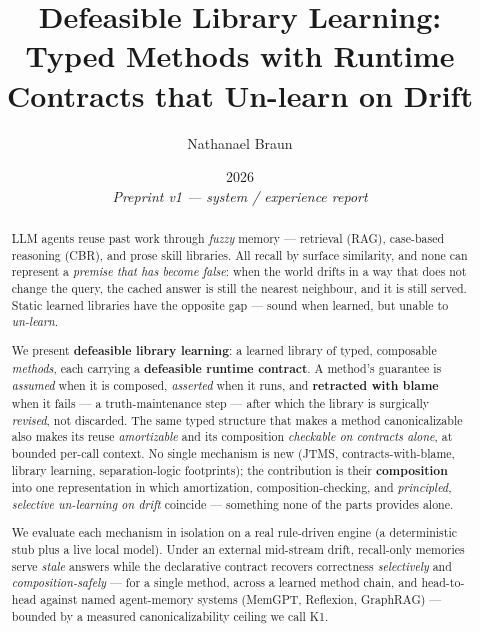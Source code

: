 \documentclass[11pt]{article}
\title{\textbf{Defeasible Library Learning:\\ Typed Methods with Runtime Contracts that Un-learn on Drift}}
\author{Nathanael Braun}
\date{2026 \\[2pt] {\normalsize\itshape Preprint v1 --- system / experience report}}
\newcommand{\K}{\textsf{K1}}
\begin{document}
\maketitle

\begin{abstract}
LLM agents reuse past work through \emph{fuzzy} memory --- retrieval (RAG), case-based reasoning (CBR), and prose
skill libraries. All recall by surface similarity, and none can represent a \emph{premise that has become false}:
when the world drifts in a way that does not change the query, the cached answer is still the nearest neighbour, and
it is still served. Static learned libraries have the opposite gap --- sound when learned, but unable to
\emph{un-learn}.

We present \textbf{defeasible library learning}: a learned library of typed, composable \emph{methods}, each
carrying a \textbf{defeasible runtime contract}. A method's guarantee is \emph{assumed} when it is composed,
\emph{asserted} when it runs, and \textbf{retracted with blame} when it fails --- a truth-maintenance step --- after
which the library is surgically \emph{revised}, not discarded. The same typed structure that makes a method
canonicalizable also makes its reuse \emph{amortizable} and its composition \emph{checkable on contracts alone}, at
bounded per-call context. No single mechanism is new (JTMS, contracts-with-blame, library learning,
separation-logic footprints); the contribution is their \textbf{composition} into one representation in which
amortization, composition-checking, and \emph{principled, selective un-learning on drift} coincide --- something
none of the parts provides alone.

We evaluate each mechanism in isolation on a real rule-driven engine (a deterministic stub plus a live local
model). Under an external mid-stream drift, recall-only memories serve \emph{stale} answers while the declarative
contract recovers correctness \emph{selectively} and \emph{composition-safely} --- for a single method, across a
learned method chain, and head-to-head against named agent-memory systems (MemGPT, Reflexion, GraphRAG) --- bounded
by a measured canonicalizability ceiling we call \K{}.
\end{abstract}
\end{document}
